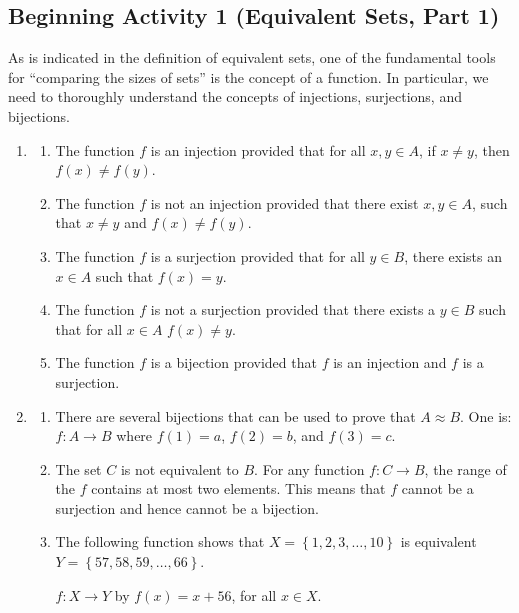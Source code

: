\documentclass[11pt]{article}
\begin{document}
\subsection*{Beginning Activity 1 (Equivalent Sets, Part 1)}
As is indicated in the definition of equivalent sets, one of the fundamental tools for ``comparing the sizes of sets'' is the concept of a function.  In particular, we need to thoroughly understand the concepts of injections, surjections, and bijections.
\begin{enumerate}
\item \begin{enumerate}
\item The function $f$ is an injection provided that for all $x, y \in A$, if $x \ne y$, then 
$f \left( x \right) \ne f \left( y \right)$.
\item The function $f$ is not an injection provided that there exist $x, y \in A$, such that  
$x \ne y$ and $f \left( x \right) \ne f \left( y \right)$.
\item The function $f$ is a surjection provided that for all $y \in B$, there exists an $x \in A$ such that $f \left( x \right) = y$.
\item The function $f$ is not a surjection provided that there exists a $y \in B$ such that for all $x \in A$ $f \left( x \right) \ne y$.
\item The function $f$ is a bijection provided that $f$ is an injection and $f$ is a surjection.
\end{enumerate}

\item \begin{enumerate}
\item There are several bijections that can be used to prove that $A \approx B$.  One is:  
$f:A \to B$ where $f \left( 1 \right) = a$, $f \left( 2 \right) = b$, and 
$f \left( 3 \right) = c$.

\item The set $C$ is not equivalent to $B$.  For any function $f: C \to B$, the range of the $f$ contains at most two elements.  This means that $f$ cannot be a surjection and hence cannot be a bijection.

\item The following function shows that $X = \left\{ 1, 2, 3, \ldots, 10 \right\}$ is equivalent 
$Y = \left\{ 57, 58, 59, \ldots, 66 \right\}$.

$f:X \to Y$ by $f \left( x \right) = x + 56$, for all $x \in X$.
\end{enumerate}


\end{enumerate}
\end{document}
